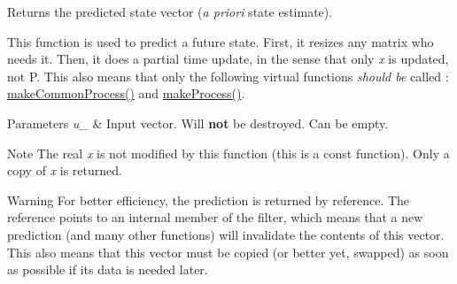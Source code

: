 Returns the predicted state vector ({\itshape a priori} state estimate). 

This function is used to predict a future state. First, it resizes any matrix who needs it. Then, it does a partial time update, in the sense that only {\itshape x} is updated, not P. This also means that only the following virtual functions {\itshape should be} called \+: {\ttfamily \mbox{\hyperlink{classKalman_1_1EKFilter_aace6f213340e7a0c78541454b13e8586}{make\+Common\+Process()}}} and {\ttfamily \mbox{\hyperlink{classKalman_1_1EKFilter_a778232d397d981c08b3ca23ea800aa6a}{make\+Process()}}}. 
\begin{DoxyParams}{Parameters}
{\em u\+\_\+} & Input vector. Will {\bfseries not} be destroyed. Can be empty. \\
\hline
\end{DoxyParams}
\begin{DoxyNote}{Note}
The real {\itshape x} is not modified by this function (this is a {\ttfamily const} function). Only a copy of {\itshape x} is returned. 
\end{DoxyNote}
\begin{DoxyWarning}{Warning}
For better efficiency, the prediction is returned by reference. The reference points to an internal member of the filter, which means that a new prediction (and many other functions) will invalidate the contents of this vector. This also means that this vector must be copied (or better yet, swapped) as soon as possible if its data is needed later. 
\end{DoxyWarning}
\mbox{\label{classKalman_1_1EKFilter_a0c311fd7fc6d57c206029ea0e902cf2e}} 
